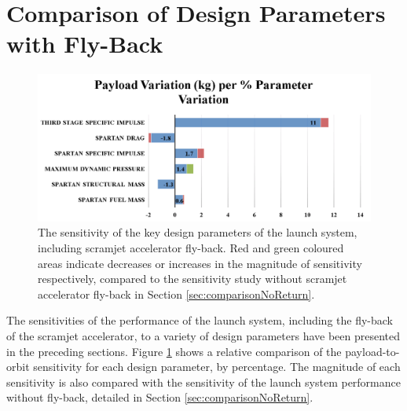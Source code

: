\section{Comparison of Design Parameters with Fly-Back}

\begin{figure}[th]
	\centering
	\includegraphics[width=0.99\linewidth]{figures/6_FlyBack/BarChart}
	\caption{The sensitivity of the key design parameters of the launch system, including scramjet accelerator fly-back. Red and green coloured areas indicate decreases or increases in the magnitude of sensitivity respectively, compared to the sensitivity study without scramjet accelerator fly-back in Section \ref{sec:comparisonNoReturn}.}
	\label{fig:BarChartreturn}
\end{figure}

The sensitivities of the performance of the launch system, including the fly-back of the scramjet accelerator, to a variety of design parameters have been presented in the preceding sections. Figure \ref{fig:BarChartreturn} shows a relative comparison of the payload-to-orbit sensitivity for each design parameter, by percentage. The magnitude of each sensitivity is also compared with the sensitivity of the launch system performance without fly-back, detailed in Section \ref{sec:comparisonNoReturn}.

